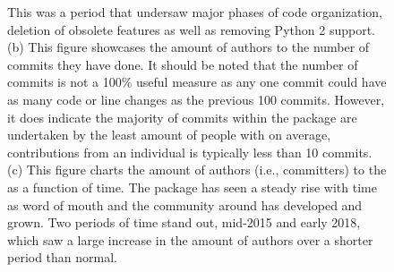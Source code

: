 \begin{figure}
{	This was a period that undersaw major phases of code organization, deletion of obsolete features as well as removing Python 2 support.
	(b) This figure showcases the amount of authors to the number of commits they have done.
	It should be noted that the number of commits is not a 100\% useful measure as any one commit could have as many code or line changes as the previous 100 commits.
	However, it does indicate the majority of commits within the package are undertaken by the least amount of people with on average, contributions from an individual is typically less than 10 commits.
	(c) This figure charts the amount of authors (i.e., committers) to the \sunpypkg as a function of time.
	The package has seen a steady rise with time as word of mouth and the community around \sunpy has developed and grown.
	Two periods of time stand out, mid-2015 and early 2018, which saw a large increase in the amount of authors over a shorter period than normal.
}
\label{fig:metafig}
\end{figure}
